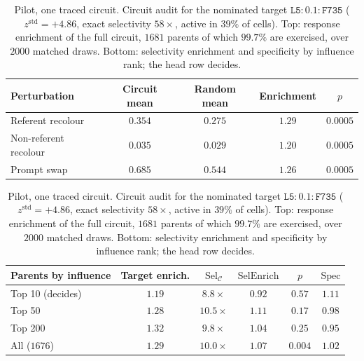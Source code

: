 \begin{table}[t]
\caption{Pilot, one traced circuit. Circuit audit for the nominated target $\mathtt{L5}\!:\!0.1\!:\!\mathtt{F735}$
($z^{\mathrm{std}}=+4.86$, exact selectivity $58\times$, active in $39\%$ of
cells). Top: response enrichment of the full circuit, $1681$ parents of which
$99.7\%$ are exercised, over $2000$ matched draws. Bottom: selectivity
enrichment and specificity by influence rank; the head row decides.}
\label{tab:cf-validation}
\begin{center}
\small
\begin{tabular}{lcccc}
\hline
Perturbation & Circuit mean & Random mean & Enrichment & $p$ \\
\hline
Referent recolour     & $0.354$ & $0.275$ & $1.29$ & $0.0005$ \\
Non-referent recolour & $0.035$ & $0.029$ & $1.20$ & $0.0005$ \\
Prompt swap           & $0.685$ & $0.544$ & $1.26$ & $0.0005$ \\
\hline
\end{tabular}

\medskip
\begin{tabular}{lccccc}
\hline
Parents by influence & Target enrich. & $\mathrm{Sel}_{\mathcal{C}}$ & $\mathrm{SelEnrich}$ & $p$ & $\mathrm{Spec}$ \\
\hline
Top 10 (decides) & $1.19$ & $8.8\times$  & $0.92$ & $0.57$  & $1.11$ \\
Top 50           & $1.28$ & $10.5\times$ & $1.11$ & $0.17$  & $0.98$ \\
Top 200          & $1.32$ & $9.8\times$  & $1.04$ & $0.25$  & $0.95$ \\
All ($1676$)     & $1.29$ & $10.0\times$ & $1.07$ & $0.004$ & $1.02$ \\
\hline
\end{tabular}
\end{center}
\end{table}

